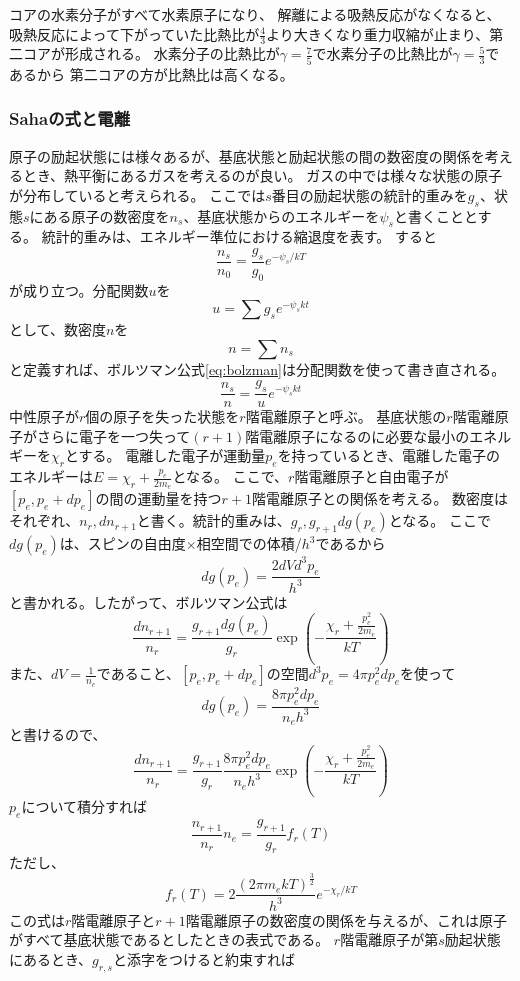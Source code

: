 \documentclass[a4j, dvipdfmx]{jsarticle}
\newcommand{\beq}{\begin{equation}}
\newcommand{\eeq}{\end{equation}}
\begin{document}
コアの水素分子がすべて水素原子になり、
解離による吸熱反応がなくなると、吸熱反応によって下がっていた比熱比が$\frac{4}{3}$より大きくなり重力収縮が止まり、第二コアが形成される。
水素分子の比熱比が$\gamma = \frac{7}{5}$で水素分子の比熱比が$\gamma = \frac{5}{3}$であるから
第二コアの方が比熱比は高くなる。
\subsubsection{Sahaの式と電離}
原子の励起状態には様々あるが、基底状態と励起状態の間の数密度の関係を考えるとき、熱平衡にあるガスを考えるのが良い。
ガスの中では様々な状態の原子が分布していると考えられる。
ここでは$s$番目の励起状態の統計的重みを$g_s$、状態$s$にある原子の数密度を$n_s$、基底状態からのエネルギーを$\psi_s$と書くこととする。
統計的重みは、エネルギー準位における縮退度を表す。
すると
\beq
\frac{n_s}{n_0} = \frac{g_s}{g_0}e^{-\psi_s/kT}\label{eq:bolzman}
\eeq
が成り立つ。分配関数$u$を
\beq
    u = \sum g_s e^{-\psi_s kt} 
\eeq
として、数密度$n$を
\beq
    n = \sum n_s
\eeq
と定義すれば、ボルツマン公式\eqref{eq:bolzman}は分配関数を使って書き直される。
\beq
    \frac{n_s}{n} = \frac{g_s}{u} e^{-\psi_s kt}
\eeq
中性原子が$r$個の原子を失った状態を$r$階電離原子と呼ぶ。
基底状態の$r$階電離原子がさらに電子を一つ失って$(r+1)$階電離原子になるのに必要な最小のエネルギーを$\chi_r$とする。
電離した電子が運動量$p_e$を持っているとき、電離した電子のエネルギーは$E = \chi_r + \frac{p_e}{2m_e}$となる。
ここで、$r$階電離原子と自由電子が$[p_e, p_e + dp_e]$の間の運動量を持つ$r+1$階電離原子との関係を考える。
数密度はそれぞれ、$n_r, dn_{r+1}$と書く。統計的重みは、$g_r, g_{r+1}dg(p_e)$となる。
ここで$dg(p_e)$は、スピンの自由度$\times$相空間での体積/$h^3$であるから
\beq
dg(p_e) = \frac{2dVd^3p_e}{h^3}
\eeq
と書かれる。したがって、ボルツマン公式は
\beq
\frac{dn_{r+1}}{n_r} = \frac{g_{r+1}dg(p_e)}{g_r} \exp\left(- \frac{\chi_r + \frac{p_e^2}{2m_e}}{kT}\right)
\eeq
また、$dV = \frac{1}{n_e}$であること、$[p_e, p_e + dp_e]$の空間$d^3p_e = 4\pi p_e^2 dp_e$を使って
\beq
dg(p_e) = \frac{8\pi p_e^2dp_e}{n_eh^3}
\eeq
と書けるので、
\beq
\frac{dn_{r+1}}{n_r} = \frac{g_{r+1}}{g_r}\frac{8\pi p_e^2dp_e}{n_eh^3} \exp\left(- \frac{\chi_r + \frac{p_e^2}{2m_e}}{kT}\right)
\eeq
$p_e$について積分すれば
\beq
\frac{n_{r+1}}{n_r} n_e = \frac{g_{r+1}}{g_r} f_r(T)\label{eq:sahaeasy}
\eeq
ただし、
\beq
f_r(T) = 2 \frac{(2\pi m_e kT)^{\frac{3}{2}}}{h^3} e^{-\chi_r/kT}
\eeq
この式は$r$階電離原子と$r+1$階電離原子の数密度の関係を与えるが、これは原子がすべて基底状態であるとしたときの表式である。
$r$階電離原子が第$s$励起状態にあるとき、$g_{r, s}$と添字をつけると約束すれば
\end{document}
